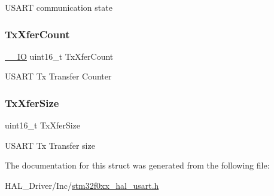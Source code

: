 U\+S\+A\+RT communication state \mbox{\label{struct_u_s_a_r_t___handle_type_def_a1823437fbed80bdd1510782ced4e5532}} 
\subsubsection{\texorpdfstring{Tx\+Xfer\+Count}{TxXferCount}}
{\footnotesize\ttfamily \hyperlink{core__sc300_8h_aec43007d9998a0a0e01faede4133d6be}{\+\_\+\+\_\+\+IO} uint16\+\_\+t Tx\+Xfer\+Count}

U\+S\+A\+RT Tx Transfer Counter \mbox{\label{struct_u_s_a_r_t___handle_type_def_a80907b65d6f9541bc0dee444d16bc45b}} 
\subsubsection{\texorpdfstring{Tx\+Xfer\+Size}{TxXferSize}}
{\footnotesize\ttfamily uint16\+\_\+t Tx\+Xfer\+Size}

U\+S\+A\+RT Tx Transfer size 

The documentation for this struct was generated from the following file\+:\begin{DoxyCompactItemize}
\item 
H\+A\+L\+\_\+\+Driver/\+Inc/\hyperlink{stm32f0xx__hal__usart_8h}{stm32f0xx\+\_\+hal\+\_\+usart.\+h}\end{DoxyCompactItemize}
